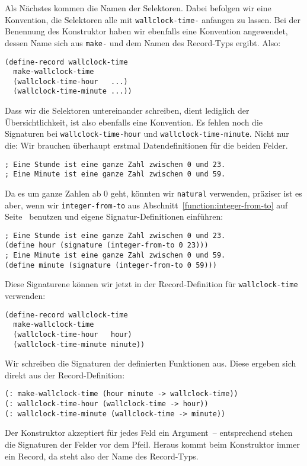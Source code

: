 \mantraschreib*

\noindent Als Nächstes kommen die Namen der Selektoren.  Dabei befolgen wir eine
Konvention, die Selektoren alle mit \lstinline{wallclock-time-} anfangen
zu lassen.  Bei der Benennung des Konstruktor haben wir ebenfalls
eine Konvention angewendet, dessen Name sich aus \lstinline{make-} und
dem Namen des Record-Typs ergibt.  Also:
%
\begin{lstlisting}
(define-record wallclock-time
  make-wallclock-time
  (wallclock-time-hour   ...)
  (wallclock-time-minute ...))
\end{lstlisting}
%
Dass wir die Selektoren untereinander schreiben, dient lediglich der
Übersichtlichkeit, ist also ebenfalls eine Konvention.  Es fehlen noch
die Signaturen bei \lstinline{wallclock-time-hour} und
\lstinline{wallclock-time-minute}.  Nicht nur die: Wir brauchen
überhaupt erstmal Datendefinitionen für die beiden Felder.
%
\begin{lstlisting}
; Eine Stunde ist eine ganze Zahl zwischen 0 und 23.
; Eine Minute ist eine ganze Zahl zwischen 0 und 59.
\end{lstlisting}
%
Da es um ganze Zahlen ab 0 geht, könnten wir \lstinline{natural}
verwenden, präziser ist es aber, wenn wir \lstinline{integer-from-to}
aus Abschnitt~\ref{function:integer-from-to} auf
Seite~\pageref{function:integer-from-to} benutzen und eigene
Signatur-Definitionen einführen:
%
\begin{lstlisting}
; Eine Stunde ist eine ganze Zahl zwischen 0 und 23.
(define hour (signature (integer-from-to 0 23)))
; Eine Minute ist eine ganze Zahl zwischen 0 und 59.
(define minute (signature (integer-from-to 0 59)))
\end{lstlisting}
%
Diese Signaturene können wir jetzt in der Record-Definition für
\lstinline{wallclock-time} verwenden:
%
\begin{lstlisting}
(define-record wallclock-time
  make-wallclock-time
  (wallclock-time-hour   hour)
  (wallclock-time-minute minute))
\end{lstlisting}
%
Wir schreiben die Signaturen der definierten Funktionen aus.  Diese
ergeben sich direkt aus der Record-Definition:
%
\begin{lstlisting}
(: make-wallclock-time (hour minute -> wallclock-time))
(: wallclock-time-hour (wallclock-time -> hour))
(: wallclock-time-minute (wallclock-time -> minute))
\end{lstlisting}
%
Der Konstruktor akzeptiert für jedes Feld ein Argument~-- entsprechend
stehen die Signaturen der Felder vor dem Pfeil.  Heraus kommt beim
Konstruktor immer ein Record, da steht also der Name des Record-Typs.

